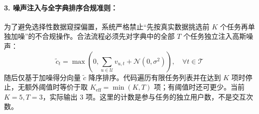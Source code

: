 \paragraph{3. 噪声注入与全字典排序合规准则：}
为了避免选择性数据窥探偏置，系统严格禁止“先按真实数据挑选前 $K$ 个任务再单独加噪”的不合规操作。合法流程必须先对字典中的全部 $T$ 个任务独立注入高斯噪声：
\begin{equation}
  \tilde{c}_t = \max\left(0, \sum_{u \in \mathcal{U}} v_{u, t} + \mathcal{N}(0, \sigma^2)\right), \quad \forall t \in \mathcal{T}
\end{equation}
随后仅基于加噪得分向量 $\tilde{c}$ 降序排序。代码遍历有限任务列表并在达到 $K$ 项时停止，无额外阈值时等价于取 $K_{\text{eff}}=\min(K,T)$ 项；有阈值时还可更少。当前 $K=5,T=3$，实际输出 3 项。这里的计数是参与任务的独立用户数，不是交互次数。
